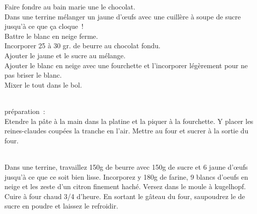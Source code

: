 \begin{minipage}[c]{\textwidth}
Faire fondre au bain marie une le chocolat. \\
Dans une terrine mélanger un jaune d’œufs avec une cuillère à soupe de sucre jusqu’à ce que ça cloque ! \\
Battre le blanc en neige ferme.\\
Incorporer 25 à 30 gr. de beurre au chocolat fondu.\\
Ajouter le jaune et le sucre au mélange.\\
Ajouter le blanc en neige avec une fourchette et l’incorporer légèrement pour ne pas briser le blanc. \\
Mixer le tout dans le bol.\\
\\

\end{minipage}

\begin{minipage}[c]{\textwidth}
préparation :\\
Etendre la pâte à la main dans la platine et la piquer à la fourchette. Y placer les reines-claudes coupées la tranche en l'air. Mettre au four et sucrer à la sortie du four.\\
\\

\end{minipage}

\begin{minipage}[c]{\textwidth}
Dans une terrine, travaillez 150g de beurre avec 150g de sucre et 6 jaune d'œufs jusqu'à ce que ce soit bien lisse. Incorporez y 180g de farine, 9 blancs d'oeufs en neige et les zeste d'un citron finement haché. Versez dans le moule à kugelhopf. Cuire à four chaud 3/4 d'heure. En sortant le gâteau du four, saupoudrez le de sucre en poudre et laissez le refroidir.\\
\\

\end{minipage}

